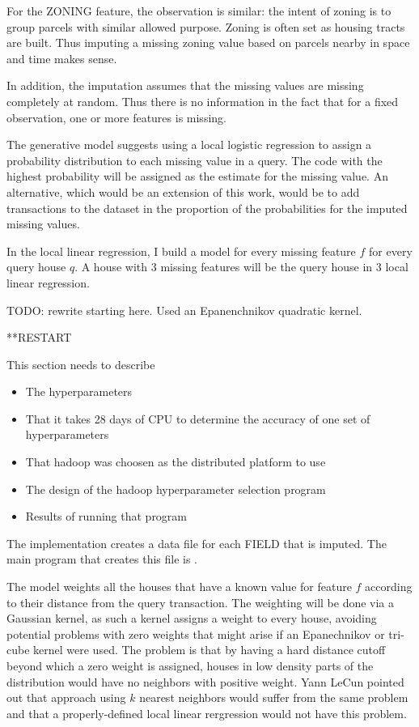 For the ZONING feature, the observation is similar: the intent of zoning is to
group parcels with similar allowed purpose. Zoning is often set as housing
tracts are built. Thus imputing a missing zoning value based on parcels nearby
in space and time makes sense.

In addition, the imputation assumes that the missing values are
missing completely at random. Thus there is no information in the fact
that for a fixed observation, one or more features is missing.

The generative model suggests using a local logistic regression to assign a
probability distribution to each missing value in a query. The code with the
highest probability will be assigned as the estimate for the missing value. An
alternative, which would be an extension of this work, would be to add
transactions to the dataset in the proportion of the probabilities for the
imputed missing values.

In the local linear regression, I build a model for every missing
feature $f$ for every query house $q$. A house with 3 missing features
will be the query house in 3 local linear regression.

TODO: rewrite starting here. Used an Epanenchnikov quadratic kernel.

**RESTART

This section needs to describe
\begin{itemize}
  \item The hyperparameters
  \item That it takes 28 days of CPU to determine the accuracy of one
    set of hyperparameters
  \item That hadoop was choosen as the distributed platform to use
  \item The design of the hadoop hyperparameter selection program
  \item Results of running that program
\end{itemize}

The implementation creates a data file 
for each FIELD that is imputed. The main program that creates this file
is .

The model weights all the houses that have a known value for feature
$f$ according to their distance from the query
transaction. The weighting will be done via a Gaussian kernel, as such
a kernel assigns a weight to every house, avoiding potential problems with
zero weights that might arise if an Epanechnikov or tri-cube kernel
were used. The problem is that by having a hard distance cutoff beyond
which a zero weight is assigned, houses in low density parts of the
distribution would have no neighbors with positive weight. Yann LeCun
pointed out that approach using $k$ nearest neighbors would suffer
from the same problem and that a properly-defined local linear
rergression would not have this problem.

